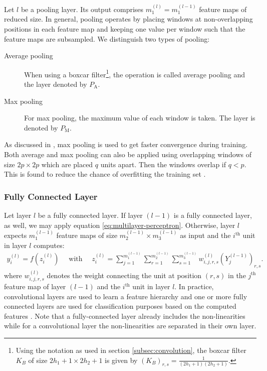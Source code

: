 Let $l$ be a pooling layer. Its output comprises $m_1^{(l)} = m_1^{(l-1)}$ feature maps of reduced size. In general, pooling operates by placing windows at non-overlapping positions in each feature map and keeping one value per window such that the feature maps are subsampled. We distinguish two types of pooling:
\begin{description}
	\item[Average pooling] When using a boxcar filter\footnote{Using the notation as used in section \ref{subsec:convolution}, the boxcar filter $K_B$ of size $2h_1 + 1\times 2h_2 + 1$ is given by $\left(K_B\right)_{r,s} = \frac{1}{(2h_1 + 1)(2h_2 + 1)}$.}, the operation is called average pooling and the layer denoted by $P_\text{A}$.
	\item[Max pooling] For max pooling, the maximum value of each window is taken. The layer is denoted by $P_\text{M}$.
\end{description}
As discussed in \cite{SchererMuellerBehnke:2010}, max pooling is used to get faster convergence during training. Both average and max pooling can also be applied using overlapping windows of size $2p \times 2p$ which are placed $q$ units apart. Then the windows overlap if $q < p$. This is found to reduce the chance of overfitting the training set \cite{KrizhevskySutskeverHinton:2012}.

\subsubsection{Fully Connected Layer}
\label{subsubsec:fully-connected-layer}

Let layer $l$ be a fully connected layer. If layer $(l-1)$ is a fully connected layer, as well, we may apply equation \eqref{eq:multilayer-perceptron}. Otherwise, layer $l$ expects $m_1^{(l-1)}$ feature maps of size $m_2^{(l-1)} \times m_3^{(l-1)}$ as input and the $i^{\text{th}}$ unit in layer $l$ computes:
\begin{align}
	y_i^{(l)} = f\left(z_i^{(l)}\right)\quad\text{ with }\quad z_i^{(l)} = \sum _{j = 1}^{m_1^{(l-1)}} \sum _{r = 1} ^{m_2^{(l-1)}} \sum _{s = 1}^{m_3^{(l-1)}} w_{i,j,r,s}^{(l)} \left( Y_j^{(l-1)} \right)_{r,s}.
\end{align}
where $w_{i,j,r,s}^{(l)}$ denotes the weight connecting the unit at position $(r,s)$ in the $j^{\text{th}}$ feature map of layer $(l - 1)$ and the $i^{\text{th}}$ unit in layer $l$. In practice, convolutional layers are used to learn a feature hierarchy and one or more fully connected layers are used for classification purposes based on the computed features \cite{LeCunBoserDenkerHenderson:1989, LeCunKavukvuogluFarabet:2010}. Note that a fully-connected layer already includes the non-linearities while for a convolutional layer the non-linearities are separated in their own layer.

